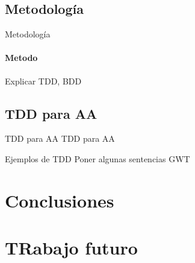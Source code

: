 \documentclass[utf8,draft]{beamer}
\begin{document}
\subsection*{Metodología}
\begin{frame}{Metodología}
  \framesubtitle{Metodo}
  Explicar TDD, BDD
\end{frame}

\subsection*{TDD para AA}
\begin{frame}{TDD para AA}
    TDD para AA
\end{frame}

\begin{frame}{Ejemplos de TDD}
  Poner algunas sentencias GWT    
\end{frame}

\section{Conclusiones}
\section{TRabajo futuro}


\end{document}
